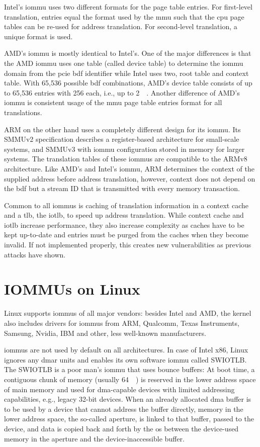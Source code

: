 Intel's \ac{iommu} uses two different formats for the page table entries. For
first-level translation, entries equal the format used by the \ac{mmu} such that
the \ac{cpu} page tables can be re-used for address translation. For
second-level translation, a unique format is used.

AMD's \ac{iommu} is mostly identical to Intel's. One of the major differences is
that the AMD \ac{iommu} uses one table (called device table) to determine the
\ac{iommu} domain from the \ac{pcie} \ac{bdf} identifier while Intel uses two,
root table and context table. With 65,536 possible \ac{bdf} combinations, AMD's
device table consists of up to 65,536 entries with \SI{256}{\bit} each, i.e., up
to \SI{2}{\mebi\byte}. Another difference of AMD's \ac{iommu} is consistent
usage of the \ac{mmu} page table entries format for all translations.

ARM on the other hand uses a completely different design for its \ac{iommu}. Its
SMMUv2 specification describes a register-based architecture for small-scale
systems, and SMMUv3 with \ac{iommu} configuration stored in memory for larger
systems. The translation tables of these \acp{iommu} are compatible to the ARMv8
architecture. Like AMD's and Intel's \ac{iommu}, ARM determines the context of
the supplied address before address translation, however, context does not
depend on the \ac{bdf} but a stream ID that is transmitted with every memory
transaction.

Common to all \acp{iommu} is caching of translation information in a context
cache and a \ac{tlb}, the \ac{iotlb}, to speed up address translation. While
context cache and \ac{iotlb} increase performance, they also increase complexity
as caches have to be kept up-to-date and entries must be purged from the caches
when they become invalid. If not implemented properly, this creates new
vulnerabilities as previous attacks have shown.


\section{IOMMUs on Linux}
\label{sec:iommus_on_linux}

Linux supports \acp{iommu} of all major vendors: besides Intel and AMD, the
kernel also includes drivers for \acp{iommu} from ARM, Qualcomm, Texas
Instruments, Samsung, Nvidia, IBM and other, less well-known manufacturers.

\acp{iommu} are not used by default on all architectures. In case of Intel x86,
Linux ignores any \ac{dmar} units and enables its own software \ac{iommu} called
SWIOTLB. The SWIOTLB is a poor man's \ac{iommu} that uses bounce buffers: At
boot time, a contiguous chunk of memory (usually \SI{64}{\mebi\byte}) is
reserved in the lower address space of main memory and used for \ac{dma}-capable
devices with limited addressing capabilities, e.g., legacy 32-bit devices. When
an already allocated \ac{dma} buffer is to be used by a device that cannot
address the buffer directly, memory in the lower address space, the so-called
aperture, is linked to that buffer, passed to the device, and data is copied
back and forth by the \ac{os} between the device-used memory in the aperture and
the device-inaccessible buffer.


